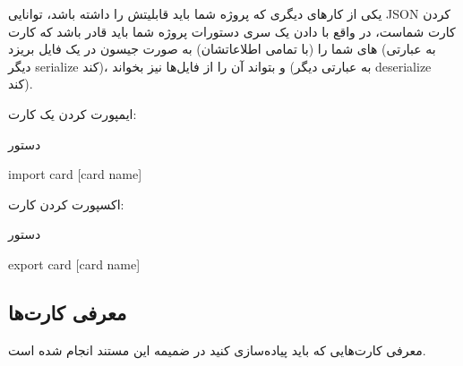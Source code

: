\documentclass[]{article}
\begin{document}
یکی از کارهای دیگری که پروژه شما باید قابلیتش را داشته باشد، توانایی JSON کردن کارت شماست، در واقع با دادن یک سری دستورات پروژه شما باید قادر باشد که کارت های شما را (با تمامی اطلاعاتشان) به صورت جیسون در یک فایل بریزد (به عبارتی دیگر serialize کند)، و بتواند آن را از فایل‌ها نیز بخواند (به عبارتی دیگر deserialize کند).

ایمپورت کردن یک کارت:

\begin{mybox}[colback=yellow]{دستور}
	\begin{latin}	
		import card [card name]
	\end{latin}
\end{mybox}

اکسپورت کردن کارت:
\begin{mybox}[colback=yellow]{دستور}
	\begin{latin}	
	export card [card name]
	
	\end{latin}
\end{mybox}

\subsection*{{\titr معرفی کارت‌ها }}

معرفی کارت‌هایی که باید پیاده‌سازی کنید در ضمیمه این مستند انجام شده است.
\end{document}
